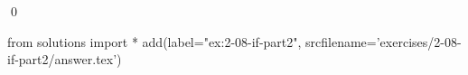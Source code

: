 
\begin{ex}
  \label{ex:2-08-if-part2}
  
  \qed
\end{ex}
\begin{python0}
from solutions import *
add(label="ex:2-08-if-part2",
    srcfilename='exercises/2-08-if-part2/answer.tex')
\end{python0}
